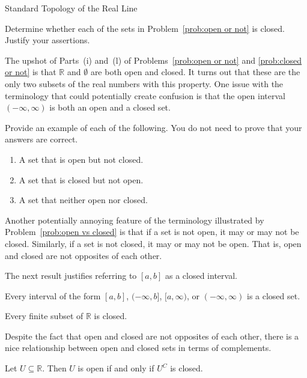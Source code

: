 \begin{section}{Standard Topology of the Real Line}
\begin{problem}\label{prob:closed or not}
Determine whether each of the sets in Problem~\ref{prob:open or not} is closed. Justify your assertions.
\end{problem}

The upshot of Parts~(i) and~(l) of Problems~\ref{prob:open or not} and \ref{prob:closed or not} is that $\mathbb{R}$ and $\emptyset$ are both open and closed.  It turns out that these are the only two subsets of the real numbers with this property. One issue with the terminology that could potentially create confusion is that the open interval $(-\infty, \infty)$ is both an open and a closed set.

\begin{problem}\label{prob:open vs closed}
Provide an example of each of the following.  You do not need to prove that your answers are correct.
\begin{enumerate}[label=\textrm{(\alph*)}]
\item A set that is open but not closed.
\item A set that is closed but not open.
\item\label{prob:open vs closed last} A set that neither open nor closed.
\end{enumerate}
\end{problem}

Another potentially annoying feature of the terminology illustrated by Problem~\ref{prob:open vs closed} is that if a set is not open, it may or may not be closed.  Similarly, if a set is not closed, it may or may not be open.  That is, open and closed are not opposites of each other.

The next result justifies referring to $[a,b]$ as a closed interval.

\begin{theorem}
Every interval of the form $[a,b]$, $(-\infty,b]$, $[a,\infty)$, or $(-\infty,\infty)$ is a closed set.
\end{theorem}

\begin{theorem}
Every finite subset of $\mathbb{R}$ is closed.
\end{theorem}

Despite the fact that open and closed are not opposites of each other, there is a nice relationship between open and closed sets in terms of complements.

\begin{theorem}
Let $U\subseteq \mathbb{R}$. Then $U$ is open if and only if $U^C$ is closed.
\end{theorem}


\end{section}
